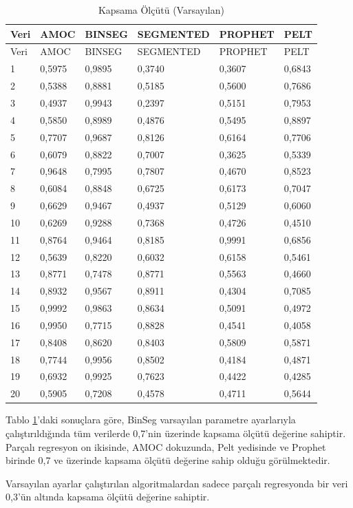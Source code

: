 \documentclass[12pt,twoside]{deuthesis}
\begin{document}
\begin{longtable}[]{@{}llllll@{}}
\caption{\label{tab:nvar9} Kapsama Ölçütü (Varsayılan)}\tabularnewline
\toprule
Veri & AMOC & BINSEG & SEGMENTED & PROPHET & PELT\tabularnewline
\midrule
\endfirsthead
\toprule
Veri & AMOC & BINSEG & SEGMENTED & PROPHET & PELT\tabularnewline
\midrule
\endhead
1 & 0,5975 & 0,9895 & 0,3740 & 0,3607 & 0,6843\tabularnewline
2 & 0,5388 & 0,8881 & 0,5185 & 0,5600 & 0,7686\tabularnewline
3 & 0,4937 & 0,9943 & 0,2397 & 0,5151 & 0,7953\tabularnewline
4 & 0,5850 & 0,8989 & 0,4876 & 0,5495 & 0,8897\tabularnewline
5 & 0,7707 & 0,9687 & 0,8126 & 0,6164 & 0,7706\tabularnewline
6 & 0,6079 & 0,8822 & 0,7007 & 0,3625 & 0,5339\tabularnewline
7 & 0,9648 & 0,7995 & 0,7807 & 0,4670 & 0,8523\tabularnewline
8 & 0,6084 & 0,8848 & 0,6725 & 0,6173 & 0,7047\tabularnewline
9 & 0,6629 & 0,9467 & 0,4937 & 0,5129 & 0,6060\tabularnewline
10 & 0,6269 & 0,9288 & 0,7368 & 0,4726 & 0,4510\tabularnewline
11 & 0,8764 & 0,9464 & 0,8185 & 0,9991 & 0,6856\tabularnewline
12 & 0,5639 & 0,8220 & 0,6032 & 0,6158 & 0,5461\tabularnewline
13 & 0,8771 & 0,7478 & 0,8771 & 0,5563 & 0,4660\tabularnewline
14 & 0,8932 & 0,9567 & 0,8911 & 0,4304 & 0,7085\tabularnewline
15 & 0,9992 & 0,9863 & 0,8634 & 0,5091 & 0,4972\tabularnewline
16 & 0,9950 & 0,7715 & 0,8828 & 0,4541 & 0,4058\tabularnewline
17 & 0,8408 & 0,8620 & 0,8403 & 0,5809 & 0,5871\tabularnewline
18 & 0,7744 & 0,9956 & 0,8502 & 0,4184 & 0,4871\tabularnewline
19 & 0,6932 & 0,9925 & 0,7623 & 0,4422 & 0,4285\tabularnewline
20 & 0,5905 & 0,7208 & 0,4578 & 0,4711 & 0,5644\tabularnewline
\bottomrule
\end{longtable}

Tablo \ref{tab:nvar9}'daki sonuçlara göre, BinSeg varsayılan parametre ayarlarıyla çalıştırıldığında tüm verilerde 0,7'nin üzerinde kapsama ölçütü değerine sahiptir. Parçalı regresyon on ikisinde, AMOC dokuzunda, Pelt yedisinde ve Prophet birinde 0,7 ve üzerinde kapsama ölçütü değerine sahip olduğu görülmektedir.

Varsayılan ayarlar çalıştırılan algoritmalardan sadece parçalı regresyonda bir veri 0,3'ün altında kapsama ölçütü değerine sahiptir.
\end{document}
